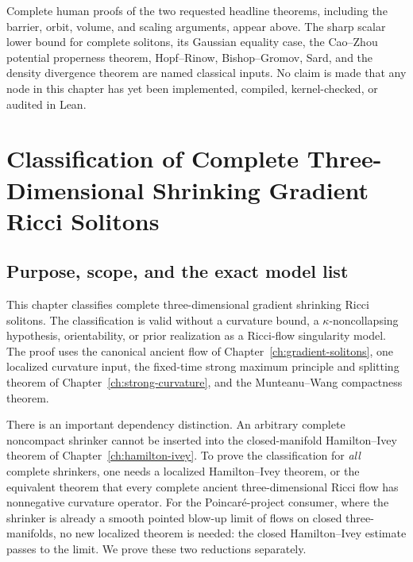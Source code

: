 \documentclass[10pt]{coll-l}
\theoremstyle{definition}
\theoremstyle{remark}
\numberwithin{section}{chapter}
\numberwithin{equation}{chapter}
\begin{document}
Complete human proofs of the two requested headline theorems, including the
barrier, orbit, volume, and scaling arguments, appear above.  The sharp
scalar lower bound for complete solitons, its Gaussian equality case,
the Cao--Zhou potential properness theorem, Hopf--Rinow, Bishop--Gromov,
Sard, and the density divergence theorem are named classical inputs.
No claim is made that any node in this chapter has yet been implemented,
compiled, kernel-checked, or audited in Lean.

\chapter[Three-Dimensional Shrinking Solitons]
{Classification of Complete Three-Dimensional Shrinking Gradient Ricci
Solitons}
\label{ch:three-dimensional-shrinkers}

\section{Purpose, scope, and the exact model list}
\label{sec:shrinker-classification-purpose}

This chapter classifies complete three-dimensional gradient shrinking Ricci
solitons.  The classification is valid without a curvature bound, a
$\kappa$-noncollapsing hypothesis, orientability, or prior realization as a
Ricci-flow singularity model.  The proof uses the canonical ancient flow of
Chapter~\ref{ch:gradient-solitons}, one localized curvature input, the
fixed-time strong maximum principle and splitting theorem of
Chapter~\ref{ch:strong-curvature}, and the Munteanu--Wang compactness
theorem.

There is an important dependency distinction.  An arbitrary complete
noncompact shrinker cannot be inserted into the closed-manifold
Hamilton--Ivey theorem of Chapter~\ref{ch:hamilton-ivey}.  To prove the
classification for \emph{all} complete shrinkers, one needs a localized
Hamilton--Ivey theorem, or the equivalent theorem that every complete
ancient three-dimensional Ricci flow has nonnegative curvature operator.
For the Poincar\'e-project consumer, where the shrinker is already a smooth
pointed blow-up limit of flows on closed three-manifolds, no new localized
theorem is needed: the closed Hamilton--Ivey estimate passes to the limit.
We prove these two reductions separately.
\end{document}

